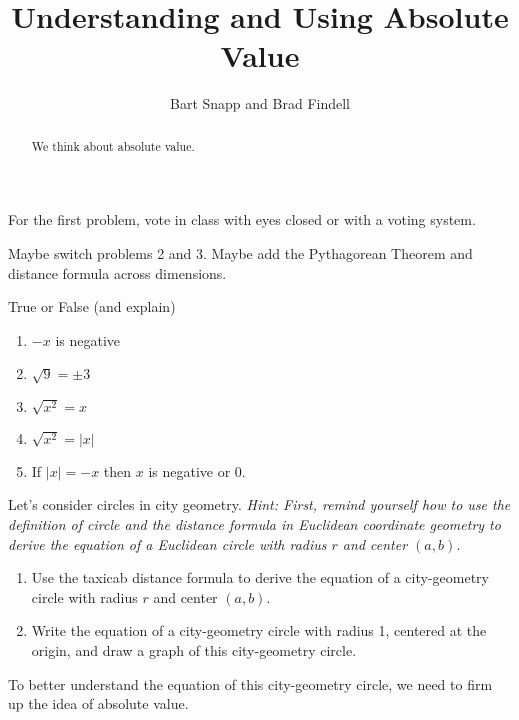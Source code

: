 \documentclass[nooutcomes,instructornotes]{ximera}
\title{Understanding and Using Absolute Value}
\author{Bart Snapp and Brad Findell}
\begin{document}
\begin{abstract}
We think about absolute value.
\end{abstract}
\maketitle

\begin{teachingnote}
For the first problem, vote in class with eyes closed or with a voting system.  

Maybe switch problems 2 and 3. Maybe add the Pythagorean Theorem and distance formula across dimensions.  
\end{teachingnote}

\begin{problem}
True or False (and explain)
\begin{enumerate}
\item $-x$ is negative
\item $\sqrt{9} = \pm 3$
\item $\sqrt{x^2} = x$
\item $\sqrt{x^2} = |x|$
\item If $|x| = -x$ then $x$ is negative or 0. 
\end{enumerate}
\vfill
\end{problem}

\begin{problem}
Let's consider circles in city geometry.  \emph{Hint: First, remind yourself how to use the definition of circle and the distance formula in Euclidean coordinate geometry to derive the equation of a Euclidean circle with radius $r$ and center $(a, b)$.}  
\begin{enumerate}
\item Use the taxicab distance formula to derive the equation of a city-geometry circle with radius $r$ and center $(a, b)$.  
\item Write the equation of a city-geometry circle with radius 1, centered at the origin, and draw a graph of this city-geometry circle.  
\end{enumerate}
\vfill
\end{problem}

\newpage

To better understand the equation of this city-geometry circle, we need to firm up the idea of absolute value.  
\end{document}
